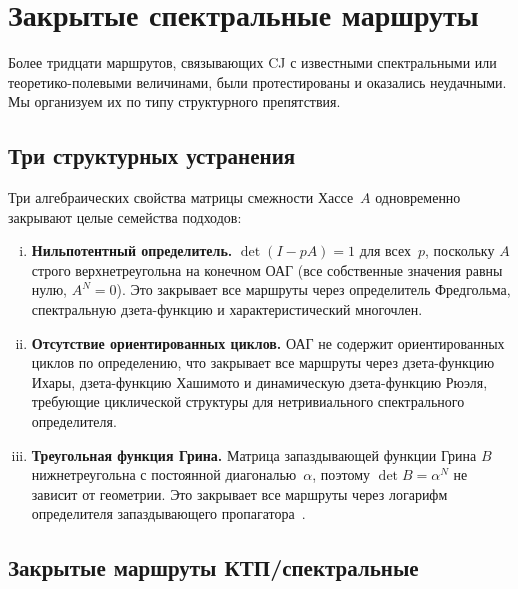 \documentclass[12pt,a4paper]{article}
\theoremstyle{plain}
\theoremstyle{definition}
\theoremstyle{remark}
\begin{document}
\section{Закрытые спектральные маршруты}
\label{sec:closed}

Более тридцати маршрутов, связывающих CJ с известными
спектральными или теоретико-полевыми величинами, были
протестированы и оказались неудачными.  Мы организуем их
по типу структурного препятствия.

\subsection{Три структурных устранения}
\label{sec:killshots}

Три алгебраических свойства матрицы смежности
Хассе~$A$ одновременно закрывают целые семейства подходов:
\begin{enumerate}[(i)]
\item \textbf{Нильпотентный определитель.}  $\det(I - pA) = 1$
  для всех~$p$, поскольку $A$ строго верхнетреугольна на
  конечном ОАГ (все собственные значения равны нулю,
  $A^N = 0$).  Это закрывает все маршруты через определитель
  Фредгольма, спектральную дзета-функцию и характеристический
  многочлен.
\item \textbf{Отсутствие ориентированных циклов.}  ОАГ не
  содержит ориентированных циклов по определению, что
  закрывает все маршруты через дзета-функцию Ихары,
  дзета-функцию Хашимото и динамическую дзета-функцию Рюэля,
  требующие циклической структуры для нетривиального
  спектрального определителя.
\item \textbf{Треугольная функция Грина.}  Матрица
  запаздывающей функции Грина $B$ нижнетреугольна с
  постоянной диагональю~$\alpha$, поэтому
  $\det B = \alpha^N$ не зависит от геометрии.  Это закрывает
  все маршруты через логарифм определителя запаздывающего
  пропагатора~\cite{Johnston:2008,Johnston:2010}.
\end{enumerate}

\subsection{Закрытые маршруты КТП/спектральные}
\label{sec:qft-routes}
\end{document}
